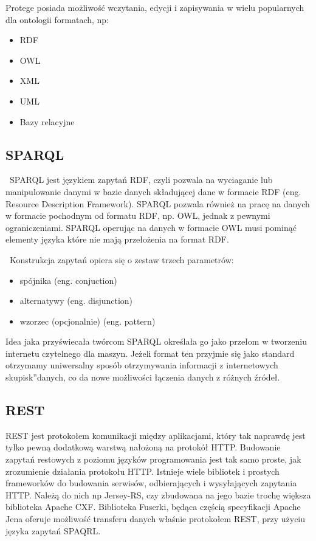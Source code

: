 Protege posiada możliwość wczytania, edycji i zapisywania w wielu popularnych dla ontologii formatach, np:
\begin{itemize}
\item RDF
\item OWL
\item XML
\item UML
\item Bazy relacyjne
\end{itemize}

\subsection{SPARQL}
\label{sec:sparql}

~SPARQL jest językiem zapytań RDF, czyli pozwala na wyciaganie lub manipulowanie danymi w bazie danych składującej dane w formacie RDF (eng. Resource Description Framework). SPARQL pozwala również na pracę na danych w formacie pochodnym od formatu RDF, np. OWL, jednak z pewnymi ograniczeniami. SPARQL operując na danych w formacie OWL musi pominąć elementy języka które nie mają przełożenia na format RDF.

~Konstrukcja zapytań opiera się o zestaw trzech parametrów:
\begin{itemize}
\item spójnika (eng. conjuction)
\item alternatywy (eng. disjunction)
\item wzorzec (opcjonalnie) (eng. pattern)
\end{itemize}

Idea jaka przyświecała twórcom SPARQL określała go jako przełom w tworzeniu internetu czytelnego dla maszyn. Jeżeli format ten przyjmie się jako standard otrzymamy uniwersalny sposób otrzymywania informacji z internetowych \quotedblbase skupisk\textquotedblright  danych, co da nowe możliwości łączenia danych z różnych źródeł.


\subsection{REST}
\label{sec:rest}

REST jest protokołem komunikacji między aplikacjami, który tak naprawdę jest tylko pewną dodatkową warstwą nałożoną na protokół HTTP. Budowanie zapytań restowych z poziomu języków programowania jest tak samo proste, jak zrozumienie działania protokołu HTTP. Istnieje wiele bibliotek i prostych frameworków do budowania serwisów, odbierających i wysyłających zapytania HTTP. Należą do nich np Jersey-RS, czy zbudowana na jego bazie trochę większa biblioteka Apache CXF. Biblioteka Fuserki, będąca częścią specyfikacji Apache Jena oferuje możliwość transferu danych właśnie protokołem REST, przy użyciu języka zapytań SPAQRL.  \cite{1}

